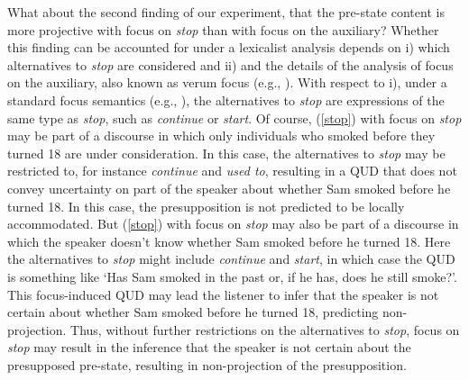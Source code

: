 \documentclass[a4paper,12pt]{article}
\newcommand{\6}{\mbox{$[\hspace*{-.6mm}[$}}
\newcommand{\9}{\mbox{$]\hspace*{-.6mm}]$}}
\begin{document}
What about the second finding of our experiment, that the pre-state content is more projective with focus on {\em stop} than with focus on the auxiliary? Whether this finding can be accounted for under a lexicalist analysis depends on i) which alternatives to {\em stop} are considered and ii) and the details of the analysis of focus on the auxiliary, also known as verum focus (e.g., \citealt{hoehle1992}). With respect to i), under a standard focus semantics (e.g., \citealt{rooth92}), the alternatives to {\em stop} are expressions of the same type as {\em stop}, such as {\em continue} or {\em start}. Of course, (\ref{stop}) with focus on {\em stop} may be part of a discourse in which only individuals who smoked before they turned 18 are under consideration. In this case, the alternatives to {\em stop} may be restricted to, for instance {\em continue} and {\em used to}, resulting in a QUD that does not convey uncertainty on part of the speaker about whether Sam smoked before he turned 18. In this case, the presupposition is not predicted to be locally accommodated. But (\ref{stop}) with focus on {\em stop} may also be part of a discourse in which the speaker doesn't know whether Sam smoked before he turned 18. Here the alternatives to {\em stop} might include {\em continue} and {\em start}, in which case the QUD is something like `Has Sam smoked in the past or, if he has, does he still smoke?'. This focus-induced QUD may lead the listener to infer that the speaker is not certain about whether Sam smoked before he turned 18, predicting non-projection. Thus, without further restrictions on the alternatives to {\em stop}, focus on {\em stop} may result in the inference that the speaker is not certain about the presupposed pre-state, resulting in non-projection of the presupposition.
\end{document}

